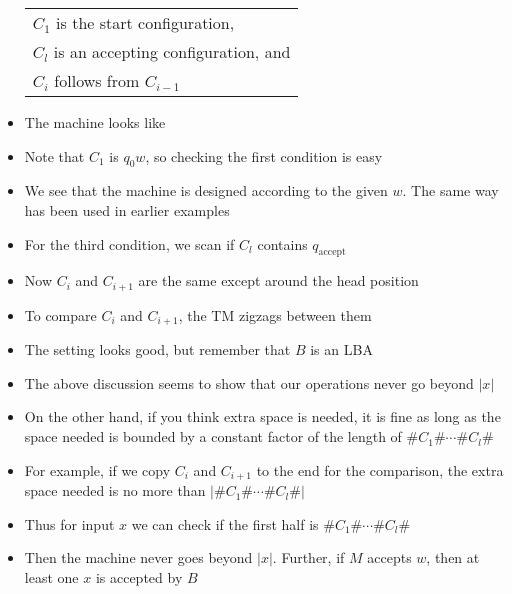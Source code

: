 \begin{frame}[allowframebreaks]
\begin{itemize}
\begin{center}
  \begin{tabular}{l}
    $C_1$  is the start configuration,\\
    $C_l$ is an accepting configuration, and\\
    $C_i$ follows from $C_{i-1}$
  \end{tabular}
\end{center}
\item The machine looks like
  \begin{center}
\end{center}
\item Note that $C_1$ is $q_0 w$, so checking the first condition is
  easy
\item We see that the machine is designed according to the given
  $w$. The same way has been used in earlier examples
\item For the third condition, we scan if $C_l$ contains $q_{\text{accept}}$
\item Now $C_i$ and $C_{i+1}$ are the same except around the
  head position
\item To compare $C_i$ and $C_{i+1}$, the TM zigzags between
  them

\item The setting looks good, but
  remember that $B$ is an LBA
\item The above discussion seems to show that our operations
  never go beyond $|x|$
\item On the other hand, if you think extra space is needed, it is
  fine as long as the space needed is 
  bounded by a constant factor of the
  length of $\#C_1\# \cdots \# C_l\#$
\item For example, if we copy $C_i$ and $C_{i+1}$ to
  the end for the comparison, the extra space needed is no more than
  $|\#C_1\# \cdots \# C_l\#|$
\item Thus for input $x$ we can check if the first
  half is $\#C_1\# \cdots \# C_l\#$
\item Then the machine never goes beyond $|x|$.
Further, if $M$ accepts $w$,
  then at least one $x$ is accepted by $B$
\end{itemize}
\end{frame}

